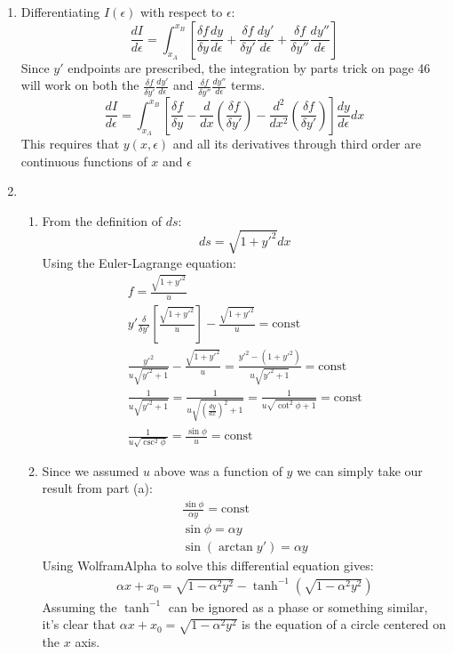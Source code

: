 \documentclass[12pt]{article}
\begin{document}
\begin{enumerate}
\begin{enumerate}
        \end{enumerate}
        \item
        Differentiating $I(\epsilon)$ with respect to $\epsilon$:
        \[
            \frac{dI}{d\epsilon}=\int_{x_A}^{x_B}\left[\frac{\delta f}{\delta y}\frac{dy}{d\epsilon}+\frac{\delta f}{\delta y'}\frac{dy'}{d\epsilon}+\frac{\delta f}{\delta y''}\frac{dy''}{d\epsilon}\right]
        \]
        Since $y'$ endpoints are prescribed, the integration by parts trick on page 46 will work on both the $\frac{\delta f}{\delta y'}\frac{dy'}{d\epsilon}$ and $\frac{\delta f}{\delta y''}\frac{dy''}{d\epsilon}$ terms.
        \[
            \frac{dI}{d\epsilon}=\int_{x_A}^{x_B}\left[\frac{\delta f}{\delta y}-\frac{d}{dx}\left(\frac{\delta f}{\delta y'}\right)-\frac{d^2}{dx^2}\left(\frac{\delta f}{\delta y'}\right)\right]\frac{dy}{d\epsilon}dx
        \]
        This requires that $y(x,\epsilon)$ and all its derivatives through third order are continuous functions of $x$ and $\epsilon$
        \item
        \begin{enumerate}
            \item
            From the definition of $ds$:
            \[
                ds=\sqrt{1+y'^2}dx
            \]
            Using the Euler-Lagrange equation:
            \begin{gather*}
                f=\frac{\sqrt{1+y'^2}}{u}\\
                y'\frac{\delta}{\delta y'}\left[\frac{\sqrt{1+y'^2}}{u}\right]-\frac{\sqrt{1+y'^2}}{u}=\text{const}\\
                \frac{y'^2}{u\sqrt{y'^2+1}}-\frac{\sqrt{1+y'^2}}{u}=\frac{y'^2-\left(1+y'^2\right)}{u\sqrt{y'^2+1}}=\text{const}\\
                \frac{1}{u\sqrt{y'^2+1}}=\frac{1}{u\sqrt{\left(\frac{dy}{dx}\right)^2+1}}=\frac{1}{u\sqrt{\cot^2{\phi}+1}}=\text{const}\\
                \frac{1}{u\sqrt{\csc^2\phi}}=\frac{\sin\phi}{u}=\text{const}
            \end{gather*}
            \item
            Since we assumed $u$ above was a function of $y$ we can simply take our result from part (a):
            \begin{gather*}
                \frac{\sin\phi}{\alpha y}=\text{const}\\
                \sin\phi=\alpha y\\
                \sin\left(\arctan y'\right)=\alpha y
            \end{gather*}
            Using WolframAlpha to solve this differential equation gives:
            \begin{gather*}
                \alpha x+x_0=\sqrt{1-\alpha^2y^2}-\tanh^{-1}\left(\sqrt{1-\alpha^2 y^2}\right)
            \end{gather*}
            Assuming the $\tanh^{-1}$ can be ignored as a phase or something similar, it's clear that $\alpha x+x_0=\sqrt{1-\alpha^2y^2}$ is the equation of a circle centered on the $x$ axis.
        \end{enumerate}
    \end{enumerate}
\end{document}
